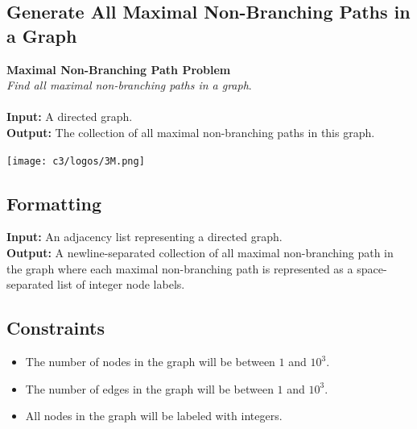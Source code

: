 \documentclass{article}
\begin{document}
\subsection{Generate All Maximal Non-Branching Paths in a Graph}
\hline\vspace{5}
\textbf{Maximal Non-Branching Path Problem}\\
\emph{Find all maximal non-branching paths in a graph}.\\ \\
\textbf{Input:} A directed graph.\\
\textbf{Output:} The collection of all maximal non-branching paths in this graph.
\begin{center}
    \texttt{[image: c3/logos/3M.png]}
\end{center}
\hline\vspace{5}

\subsection*{Formatting}
\noindent\textbf{Input:} An adjacency list representing a directed graph.\\
\noindent\textbf{Output:} A newline-separated collection of all maximal non-branching path in the graph where each maximal non-branching path is represented as a space-separated list of integer node labels.

\subsection*{Constraints}
\begin{itemize}
    \item The number of nodes in the graph will be between $1$ and $10^3$.
    \item The number of edges in the graph will be between $1$ and $10^3$.
    \item All nodes in the graph will be labeled with integers.
\end{itemize}
\pagebreak

%
\end{document}
